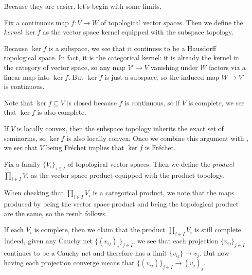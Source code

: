 \documentclass[notes.tex]{subfiles}
\begin{document}
Because they are easier, let's begin with some limits.
\begin{definition}[kernel]
	Fix a continuous map $f\colon V\to W$ of topological vector spaces. Then we define the \textit{kernel} $\ker f$ as the vector space kernel equipped with the subspace topology.
\end{definition}
\begin{remark} \label{rem:kernel-exists}
	Because $\ker f$ is a subspace, we see that it continues to be a Hausdorff topological space. In fact, it is the categorical kernel: it is already the kernel in the category of vector space, so any map $V'\to V$ vanishing under $W$ factors via a linear map into $\ker f$. But $\ker f$ is just a subspace, so the induced map $W\to V'$ is continuous.
\end{remark}
\begin{remark} \label{rem:kernel-complete}
	Note that $\ker f\subseteq V$ is closed because $f$ is continuous, so if $V$ is complete, we see that $\ker f$ is also complete.
\end{remark}
\begin{remark} \label{rem:kernel-frechet}
	If $V$ is locally convex, then the subspace topology inherits the exact set of seminorms, so $\ker f$ is also locally convex. Once we combine this argument with , we see that $V$ being Fr\'echet implies that $\ker f$ is Fr\'echet.
\end{remark}
\begin{definition}[product]
	Fix a family $\{V_i\}_{i\in I}$ of topological vector spaces. Then we define the \textit{product} $\prod_{i\in I}V_i$ as the vector space product equipped with the product topology.
\end{definition}
\begin{remark} \label{rem:product-exists}
	When checking that $\prod_{i\in I}V_i$ is a categorical product, we note that the maps produced by being the vector space product and being the topological product are the same, so the result follows.
\end{remark}
\begin{remark} \label{rem:product-complete}
	If each $V_i$ is complete, then we claim that the product $\prod_{i\in I}V_i$ is still complete. Indeed, given any Cauchy net $\{(v_{ij})_i\}_{j\in I}$, we see that each projection $\{v_{ij}\}_{j\in I}$ continues to be a Cauchy net and therefore has a limit $\{v_{ij}\}\to v_j$. But now having each projection converge means that $\{(v_{ij})\}_{j\in I}\to(v_j)_j$.
\end{remark}
\end{document}
